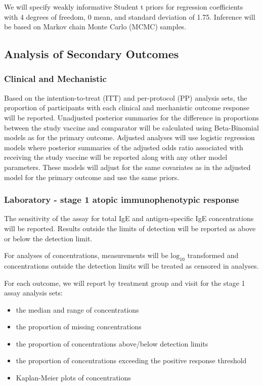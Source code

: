 \documentclass{bmcart}
\begin{document}
We will specify weakly informative Student t priors for regression coefficients with 4 degrees of freedom, 0 mean, and standard deviation of 1.75.
Inference will be based on Markov chain Monte Carlo (MCMC) samples.

\subsection*{Analysis of Secondary Outcomes}

\subsubsection*{Clinical and Mechanistic}

Based on the intention-to-treat (ITT) and per-protocol (PP) analysis sets, the proportion of participants with each clinical and mechanistic outcome response will be reported.
Unadjusted posterior summaries for the difference in proportions between the study vaccine and comparator will be calculated using Beta-Binomial models as for the primary outcome.
Adjusted analyses will use logistic regression models where posterior summaries of the adjusted odds ratio associated with receiving the study vaccine will be reported along with any other model parameters.
These models will adjust for the same covariates as in the adjusted model for the primary outcome and use the same priors.

\subsubsection*{Laboratory - stage 1 atopic immunophenotypic response}

The sensitivity of the assay for total IgE and antigen-specific IgE concentrations will be reported.
Results outside the limits of detection will be reported as above or below the detection limit.

For analyses of concentrations, measurements will be $\text{log}_{10}$ transformed and concentrations outside the detection limits will be treated as censored in analyses.

For each outcome, we will report by treatment group and visit for the stage 1 assay analysis sets:
\begin{itemize}
	\item the median and range of concentrations
	\item the proportion of missing concentrations
	\item the proportion of concentrations above/below detection limits
	\item the proportion of concentrations exceeding the positive response threshold
	\item Kaplan-Meier plots of concentrations
\end{itemize}
\end{document}
